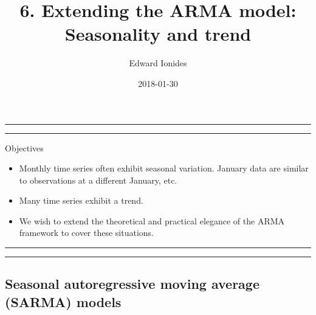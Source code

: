 \documentclass[]{article}
\title{6. Extending the ARMA model: Seasonality and trend}
\author{Edward Ionides}
\date{2018-01-30}
\begin{document}
\maketitle

{
\setcounter{tocdepth}{2}
\tableofcontents
}
\newcommand\prob{\mathbb{P}}
\newcommand\E{\mathbb{E}}
\newcommand\var{\mathrm{Var}}
\newcommand\cov{\mathrm{Cov}}
\newcommand\loglik{\ell}
\newcommand\R{\mathbb{R}}
\newcommand\data[1]{#1^*}
\newcommand\params{\, ; \,}
\newcommand\transpose{\scriptsize{T}}
\newcommand\eqspace{\quad\quad\quad}
\newcommand\lik{\mathscr{L}}
\newcommand\profileloglik[1]{\ell^\mathrm{profile}_#1}
\newcommand\ar{\phi}
\newcommand\ma{\psi}
\newcommand\AR{\Phi}
\newcommand\MA{\Psi}





\begin{center}\rule{0.5\linewidth}{\linethickness}\end{center}

\begin{center}\rule{0.5\linewidth}{\linethickness}\end{center}

Objectives

\begin{itemize}
\item
  Monthly time series often exhibit seasonal variation. January data are
  similar to observations at a different January, etc.
\item
  Many time series exhibit a trend.
\item
  We wish to extend the theoretical and practical elegance of the ARMA
  framework to cover these situations.
\end{itemize}

\begin{center}\rule{0.5\linewidth}{\linethickness}\end{center}

\begin{center}\rule{0.5\linewidth}{\linethickness}\end{center}

\subsection{Seasonal autoregressive moving average (SARMA)
models}\label{seasonal-autoregressive-moving-average-sarma-models}
\end{document}
